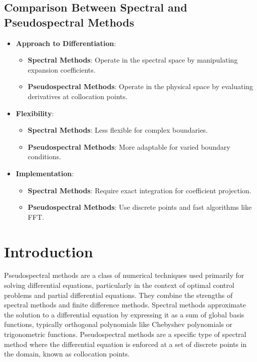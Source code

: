 \documentclass[12pt]{report} %
\begin{document}
\subsection{Comparison Between Spectral and Pseudospectral Methods}
\begin{itemize}
    \item \textbf{Approach to Differentiation}:
    \begin{itemize}
        \item \textbf{Spectral Methods}: Operate in the spectral space by manipulating expansion coefficients.
        \item \textbf{Pseudospectral Methods}: Operate in the physical space by evaluating derivatives at collocation points.
    \end{itemize}
    
    \item \textbf{Flexibility}:
    \begin{itemize}
        \item \textbf{Spectral Methods}: Less flexible for complex boundaries.
        \item \textbf{Pseudospectral Methods}: More adaptable for varied boundary conditions.
    \end{itemize}
    
    \item \textbf{Implementation}:
    \begin{itemize}
        \item \textbf{Spectral Methods}: Require exact integration for coefficient projection.
        \item \textbf{Pseudospectral Methods}: Use discrete points and fast algorithms like FFT.
    \end{itemize}
\end{itemize}


\section{Introduction}
Pseudospectral methods are a class of numerical techniques used primarily for solving differential equations, particularly in the context of optimal control problems and partial differential equations. They combine the strengths of spectral methods and finite difference methods. Spectral methods approximate the solution to a differential equation by expressing it as a sum of global basis functions, typically orthogonal polynomials like Chebyshev polynomials or trigonometric functions. Pseudospectral methods are a specific type of spectral method where the differential equation is enforced at a set of discrete points in the domain, known as collocation points.
\end{document}
